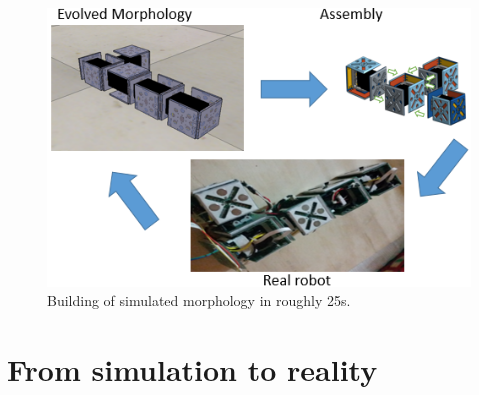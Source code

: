 \documentclass[sigconf]{acmart}
\begin{document}


\begin{figure}
 \centering
 \includegraphics[width=0.8\columnwidth]{Assembly.png}
 \caption{\label{fig:assemb} Building of simulated morphology in roughly 25s.}
 \end{figure}


\section{From simulation to reality}%
\end{document}

